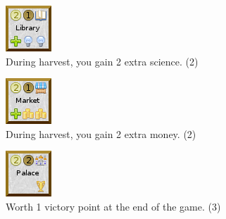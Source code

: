 \documentclass[11pt,a4paper,titlepage]{article}
\begin{document}
{  \begin{figure}[!htb]
    \begin{minipage}[c]{0.1\textwidth}
      \includegraphics[scale=.7]{doe_building_library.png}
    \end{minipage}\hfill
    \begin{minipage}[c]{0.7\textwidth}
      \captionsetup{labelformat=empty, justification=justified, singlelinecheck=false}
      \caption{During harvest, you gain 2 extra science. (2)}
    \end{minipage}\hfill
    \label{fig:building_library}
  \end{figure}

  \begin{figure}[!htb]
    \begin{minipage}[c]{0.1\textwidth}
      \includegraphics[scale=.7]{doe_building_market.png}
    \end{minipage}\hfill
    \begin{minipage}[c]{0.7\textwidth}
      \captionsetup{labelformat=empty, justification=justified, singlelinecheck=false}
      \caption{During harvest, you gain 2 extra money. (2)}
    \end{minipage}\hfill
    \label{fig:building_market}
  \end{figure}

  \begin{figure}[!htb]
    \begin{minipage}[c]{0.1\textwidth}
      \includegraphics[scale=.7]{doe_building_palace.png}
    \end{minipage}\hfill
    \begin{minipage}[c]{0.7\textwidth}
      \captionsetup{labelformat=empty, justification=justified, singlelinecheck=false}
      \caption{Worth 1 victory point at the end of the game. (3)}
    \end{minipage}\hfill
    \label{fig:building_palace}
  \end{figure}

}
\end{document}
